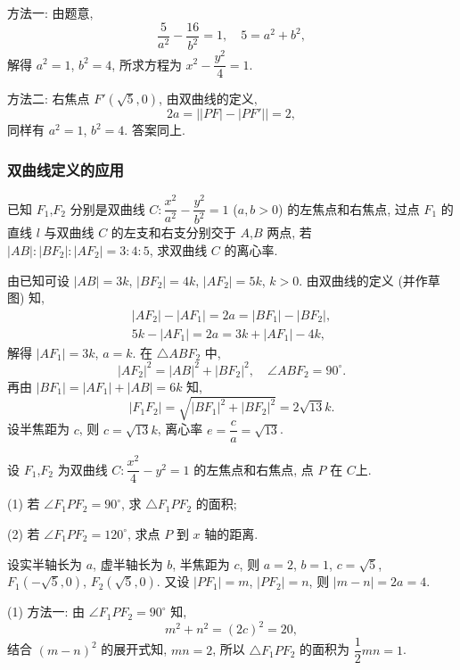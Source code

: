     方法一: 由题意,
    \[\frac{5}{a^2}- \frac{16}{b^2}=1,\quad
    5= a^2+b^2,\]
    解得 $a^2=1$, $b^2=4$, 所求方程为 $x^2-\dfrac{y^2}4=1$.

    方法二: 右焦点 $F'(\sqrt5,0)$, 由双曲线的定义,
    \[2a= \bigl||PF|- |PF'|\bigr|= 2,\]
    同样有 $a^2= 1$, $b^2= 4$. 答案同上.
\endsolution

\subsubsection{双曲线定义的应用}
\begin{example}
    已知 $F_1$,$F_2$ 分别是双曲线 $C\colon \dfrac{x^2}{a^2}- \dfrac{y^2}{b^2}=1$ ($a,b>0$) 的左焦点和右焦点, 过点 $F_1$ 的直线 $l$ 与双曲线 $C$ 的左支和右支分别交于 $A$,$B$ 两点, 若 $|AB|:|BF_2|:|AF_2| =3:4:5$, 求双曲线 $C$ 的离心率.
\end{example}
\beginsolution
    由已知可设 $|AB|= 3k$, $|BF_2|= 4k$, $|AF_2|= 5k$, $k>0$. 由双曲线的定义 (并作草图) 知,
    \[\begin{gathered}
        |AF_2|- |AF_1|= 2a= |BF_1|- |BF_2|,\\
        5k- |AF_1|= 2a= 3k+ |AF_1|- 4k,
    \end{gathered}\]
    解得 $|AF_1|= 3k$, $a=k$. 在 $\triangle ABF_2$ 中, 
    \[|AF_2|^2= |AB|^2+ |BF_2|^2,\quad 
    \angle ABF_2= 90^\circ.\]
    再由 $|BF_1|= |AF_1|+ |AB|= 6k$ 知,
    \[|F_1F_2|= \sqrt{|BF_1|^2+ |BF_2|^2}= 2\sqrt{13}k.\]
    设半焦距为 $c$, 则 $c=\sqrt{13}k$, 离心率 $e= \dfrac{c}a= \sqrt{13}$.
\endsolution

\lianxi
\begin{exercise}[s]
    设 $F_1$,$F_2$ 为双曲线 $C\colon \dfrac{x^2}4- y^2=1$ 的左焦点和右焦点, 点 $P$ 在 $C$上.
    
    (1) 若 $\angle F_1PF_2= 90^\circ$, 求 $\triangle F_1PF_2$ 的面积;

    (2) 若 $\angle F_1PF_2= 120^\circ$, 求点 $P$ 到 $x$ 轴的距离.
\end{exercise}
\beginsolution
    设实半轴长为 $a$, 虚半轴长为 $b$, 半焦距为 $c$, 则 $a=2$, $b=1$, $c=\sqrt5$, $F_1(-\sqrt5,0)$, $F_2(\sqrt5,0)$. 又设 $|PF_1|= m$, $|PF_2|= n$, 则 $|m-n|= 2a= 4$.

    (1) 方法一: 由 $\angle F_1PF_2= 90^\circ$ 知,
    \[m^2+n^2= (2c)^2= 20,\]
    结合 $(m-n)^2$ 的展开式知, $mn= 2$, 所以 $\triangle F_1PF_2$ 的面积为  $\dfrac12mn= 1$.

